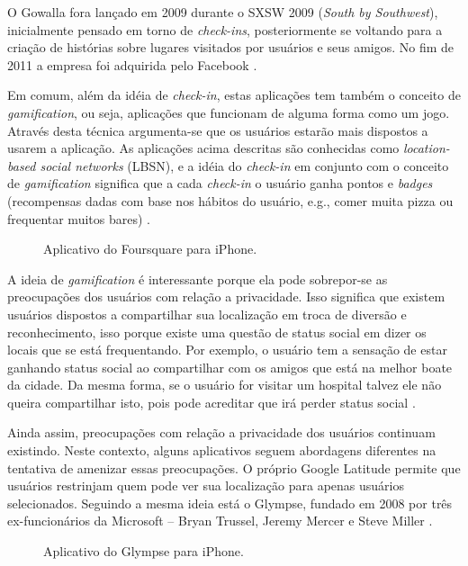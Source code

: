 \documentclass[diss]{template/setrem}
\begin{document}
O Gowalla fora lançado em 2009 durante o SXSW 2009 (\emph{South by Southwest}), inicialmente pensado em torno de \emph{check-ins}, posteriormente se voltando para a criação de histórias sobre lugares visitados por usuários e seus amigos. No fim de 2011 a empresa foi adquirida pelo Facebook \citep{Kincaid2011}.

Em comum, além da idéia de \emph{check-in}, estas aplicações tem também o conceito de \emph{gamification}, ou seja, aplicações que funcionam de alguma forma como um jogo. Através desta técnica argumenta-se que os usuários estarão mais dispostos a usarem a aplicação. As aplicações acima descritas são conhecidas como \emph{location-based social networks} (LBSN), e a idéia do \emph{check-in} em conjunto com o conceito de \emph{gamification} significa que a cada \emph{check-in} o usuário ganha pontos e \emph{badges} (recompensas dadas com base nos hábitos do usuário, e.g., comer muita pizza ou frequentar muitos bares) \citep{McKenzie2011}.

\begin{figure}[!h]
    \caption{Aplicativo do Foursquare para iPhone.}
    \label{fig:foursquare}
\end{figure}

A ideia de \emph{gamification} é interessante porque ela pode sobrepor-se as preocupações dos usuários com relação a privacidade. Isso significa que existem usuários dispostos a compartilhar sua localização em troca de diversão e reconhecimento, isso porque existe uma questão de status social em dizer os locais que se está frequentando. Por exemplo, o usuário tem a sensação de estar ganhando status social ao compartilhar com os amigos que está na melhor boate da cidade. Da mesma forma, se o usuário for visitar um hospital talvez ele não queira compartilhar isto, pois pode acreditar que irá perder status social \citep{McKenzie2011}.

Ainda assim, preocupações com relação a privacidade dos usuários continuam existindo. Neste contexto, alguns aplicativos seguem abordagens diferentes na tentativa de amenizar essas preocupações. O próprio Google Latitude permite que usuários restrinjam quem pode ver sua localização para apenas usuários selecionados. Seguindo a mesma ideia está o Glympse, fundado em 2008 por três ex-funcionários da Microsoft -- Bryan Trussel, Jeremy Mercer e Steve Miller \citep{Holdener2011}.

\begin{figure}[!h]
    \caption{Aplicativo do Glympse para iPhone.}
    \label{fig:glympse}
\end{figure}
\end{document}
